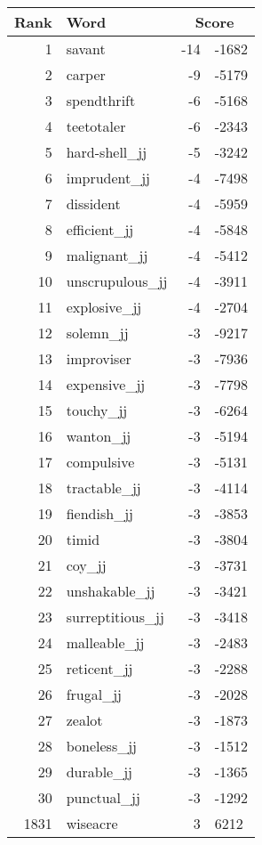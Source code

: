 \begin{longtable}[!htbp]{| rlr@{.}l |}
    \hline
    \textbf{Rank} & \textbf{Word} & \multicolumn{2}{c|}{\textbf{Score}} \\
    \hline
    \endhead
    1 & savant & -14 & -1682 \\
    2 & carper & -9 & -5179 \\
    3 & spendthrift & -6 & -5168 \\
    4 & teetotaler & -6 & -2343 \\
    5 & hard-shell\_jj & -5 & -3242 \\
    6 & imprudent\_jj & -4 & -7498 \\
    7 & dissident & -4 & -5959 \\
    8 & efficient\_jj & -4 & -5848 \\
    9 & malignant\_jj & -4 & -5412 \\
    10 & unscrupulous\_jj & -4 & -3911 \\
    11 & explosive\_jj & -4 & -2704 \\
    12 & solemn\_jj & -3 & -9217 \\
    13 & improviser & -3 & -7936 \\
    14 & expensive\_jj & -3 & -7798 \\
    15 & touchy\_jj & -3 & -6264 \\
    16 & wanton\_jj & -3 & -5194 \\
    17 & compulsive & -3 & -5131 \\
    18 & tractable\_jj & -3 & -4114 \\
    19 & fiendish\_jj & -3 & -3853 \\
    20 & timid & -3 & -3804 \\
    21 & coy\_jj & -3 & -3731 \\
    22 & unshakable\_jj & -3 & -3421 \\
    23 & surreptitious\_jj & -3 & -3418 \\
    24 & malleable\_jj & -3 & -2483 \\
    25 & reticent\_jj & -3 & -2288 \\
    26 & frugal\_jj & -3 & -2028 \\
    27 & zealot & -3 & -1873 \\
    28 & boneless\_jj & -3 & -1512 \\
    29 & durable\_jj & -3 & -1365 \\
    30 & punctual\_jj & -3 & -1292 \\
    1831 & wiseacre & 3 & 6212 \\

\end{longtable}
